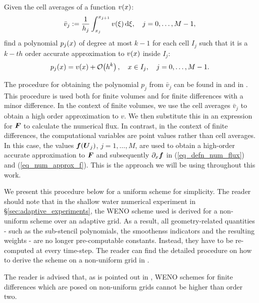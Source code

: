 \documentclass[final]{amsart}
\renewcommand{\vec}[1]{\geovec{#1}}
\numberwithin{equation}{section}
\begin{document}
\begin{Defn}
	Given the cell averages of a function $v\!\left({x}\right)$:
	\begin{equation}
	\bar{v}_j:= \frac{1}{h_j}\int_{x_j}^{x_{j+1}} v\!\left({\xi}\right)\mathrm{d}\xi, \quad j=0,\dots,M-1,
	\end{equation}
	find a polynomial $p_j\!\left({x}\right)$ of degree at most $k-1$ for each cell $I_j$ such that it is a $k-th$ order accurate approximation to $v\!\left({x}\right)$ inside $I_j$:
	\begin{equation}
	p_j\!\left({x}\right) = v\!\left({x}\right) + \mathcal{O}\!\left({h^k}\right), \quad x\in I_j, \quad j=0,\dots,M-1.
	\end{equation}
\end{Defn}
The procedure for obtaining the polynomial $p_j$ from $\bar{v}_j$ can
be found in \cite[Procedure 2.2]{shu1998essentially} and in
\cite[\S.2.2]{shu2020essentially}.  This procedure is used both for
finite volumes and for finite differences with a minor difference.  In
the context of finite volumes, we use the cell averages $\bar{v}_j$ to
obtain a high order approximation to $v$.  We then substitute this in
an expression for $\vec{F}$ to calculate the numerical flux. In
contrast, in the context of finite differences, the computational
variables are point values rather than cell averages. In this case, the values 
$\vec{f}\qp{\vec{U}_j}$, $j=1,\dots,M$, are used  to obtain a high-order accurate approximation to $\vec{F}$
and subsequently $\partial_x\vec{f}$ in (\ref{eq_defn_num_flux}) and
(\ref{eq_num_approx_f}).  This is the approach we will be using
throughout this work.

We present this procedure below for a uniform scheme for simplicity.
The reader should note that in the shallow water numerical experiment in
\S\ref{sec:adaptive_experiments}, the WENO scheme used is derived for
a non-uniform scheme over an adaptive grid.
As a result, all geometry-related quantities - such as the sub-stencil polynomials, the smoothenss indicators and the resulting weights - are no longer pre-computable constants.  Instead, they have to be re-computed at every time-step.
The reader can find the detailed procedure on how to
derive the scheme on a non-uniform grid in \cite{shu1998essentially}.

\begin{Rem}
	The reader is advised that, as is pointed out in
	\cite{shu1998essentially}, WENO schemes for finite differences which
	are posed on non-uniform grids cannot be higher than order
	two.
\end{Rem}
\end{document}

